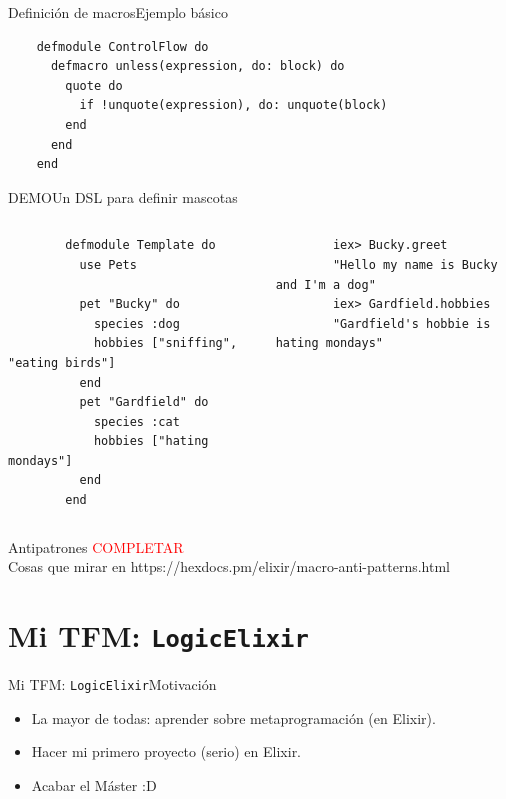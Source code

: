 \documentclass[14pt,aspectratio=169]{beamer}
\begin{document}
\begin{frame}[fragile]{Definición de macros}{Ejemplo básico}
  \begin{verbatim}
    defmodule ControlFlow do
      defmacro unless(expression, do: block) do
        quote do
          if !unquote(expression), do: unquote(block)
        end
      end
    end
  \end{verbatim}
\end{frame}

\begin{frame}[fragile]{DEMO}{Un DSL para definir mascotas}
  \begin{columns}
    \begin{column}{0.5\textwidth}
      \scriptsize\begin{verbatim}
        defmodule Template do
          use Pets

          pet "Bucky" do
            species :dog
            hobbies ["sniffing", "eating birds"]
          end
          pet "Gardfield" do
            species :cat
            hobbies ["hating mondays"]
          end
        end
      \end{verbatim}
    \end{column}
    \begin{column}{0.5\textwidth}
      \scriptsize\begin{verbatim}
        iex> Bucky.greet
        "Hello my name is Bucky and I'm a dog"
        iex> Gardfield.hobbies
        "Gardfield's hobbie is hating mondays"
      \end{verbatim}
    \end{column}
  \end{columns}
\end{frame}

\begin{frame}{Antipatrones}
  \textcolor{red}{COMPLETAR}\\
  Cosas que mirar en https://hexdocs.pm/elixir/macro-anti-patterns.html
\end{frame}

\section{Mi TFM: \texttt{LogicElixir}}
\begin{frame}{Mi TFM: \texttt{LogicElixir}}{Motivación}
  \begin{itemize}
    \item La mayor de todas: aprender sobre metaprogramación (en Elixir).
    \item Hacer mi primero proyecto (serio) en Elixir.
    \item Acabar el Máster :D
  \end{itemize}
\end{frame}
\end{document}
